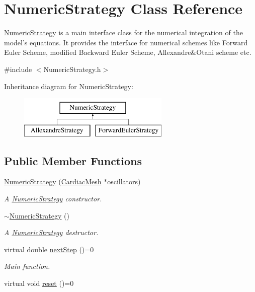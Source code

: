 \hypertarget{class_numeric_strategy}{\section{Numeric\+Strategy Class Reference}
\label{class_numeric_strategy}
}


\hyperlink{class_numeric_strategy}{Numeric\+Strategy} is a main interface class for the numerical integration of the model's equations. It provides the interface for numerical schemes like Forward Euler Scheme, modified Backward Euler Scheme, Allexandre\&Otani scheme etc.  




{\ttfamily \#include $<$Numeric\+Strategy.\+h$>$}

Inheritance diagram for Numeric\+Strategy\+:\begin{figure}[H]
\begin{center}
\leavevmode
\includegraphics[height=2.000000cm]{class_numeric_strategy}
\end{center}
\end{figure}
\subsection*{Public Member Functions}
\begin{DoxyCompactItemize}
\item 
\hyperlink{class_numeric_strategy_a8f4a5e5be06427098e3a9b3635658786}{Numeric\+Strategy} (\hyperlink{class_cardiac_mesh}{Cardiac\+Mesh} $\ast$oscillators)
\begin{DoxyCompactList}\small\item\em A \hyperlink{class_numeric_strategy}{Numeric\+Strategy} constructor. \end{DoxyCompactList}\item 
\hyperlink{class_numeric_strategy_ac167251a4c6409131a1be21ce3104870}{$\sim$\+Numeric\+Strategy} ()
\begin{DoxyCompactList}\small\item\em A \hyperlink{class_numeric_strategy}{Numeric\+Strategy} destructor. \end{DoxyCompactList}\item 
virtual double \hyperlink{class_numeric_strategy_aeab387274e9d0ebf46a0e5ad5a5fe73f}{next\+Step} ()=0
\begin{DoxyCompactList}\small\item\em Main function. \end{DoxyCompactList}\item 
virtual void \hyperlink{class_numeric_strategy_a81a1a510394e88edc2705e565d30f017}{reset} ()=0
\end{DoxyCompactItemize}

